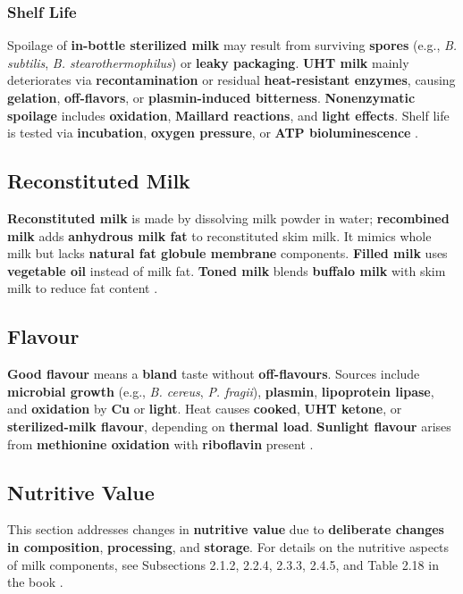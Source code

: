 \subsubsection*{Shelf Life}
Spoilage of \textbf{in-bottle sterilized milk} may result from surviving \textbf{spores} (e.g., \textit{B. subtilis}, \textit{B. stearothermophilus}) or \textbf{leaky packaging}. \textbf{UHT milk} mainly deteriorates via \textbf{recontamination} or residual \textbf{heat-resistant enzymes}, causing \textbf{gelation}, \textbf{off-flavors}, or \textbf{plasmin-induced bitterness}. \textbf{Nonenzymatic spoilage} includes \textbf{oxidation}, \textbf{Maillard reactions}, and \textbf{light effects}. Shelf life is tested via \textbf{incubation}, \textbf{oxygen pressure}, or \textbf{ATP bioluminescence} \cite*{curr_rm_01_dairy_science_technology}.

\subsection{Reconstituted Milk}
\textbf{Reconstituted milk} is made by dissolving milk powder in water; \textbf{recombined milk} adds \textbf{anhydrous milk fat} to reconstituted skim milk. It mimics whole milk but lacks \textbf{natural fat globule membrane} components. \textbf{Filled milk} uses \textbf{vegetable oil} instead of milk fat. \textbf{Toned milk} blends \textbf{buffalo milk} with skim milk to reduce fat content \cite*{curr_rm_01_dairy_science_technology}. 

\subsection{Flavour}
\textbf{Good flavour} means a \textbf{bland} taste without \textbf{off-flavours}. Sources include \textbf{microbial growth} (e.g., \textit{B. cereus}, \textit{P. fragii}), \textbf{plasmin}, \textbf{lipoprotein lipase}, and \textbf{oxidation} by \textbf{Cu} or \textbf{light}. Heat causes \textbf{cooked}, \textbf{UHT ketone}, or \textbf{sterilized-milk flavour}, depending on \textbf{thermal load}. \textbf{Sunlight flavour} arises from \textbf{methionine oxidation} with \textbf{riboflavin} present \cite*{curr_rm_01_dairy_science_technology}.

\subsection{Nutritive Value}
This section addresses changes in \textbf{nutritive value} due to \textbf{deliberate changes in composition}, \textbf{processing}, and \textbf{storage}. For details on the nutritive aspects of milk components, see Subsections 2.1.2, 2.2.4, 2.3.3, 2.4.5, and Table 2.18 in the book \cite*{curr_rm_01_dairy_science_technology}.

